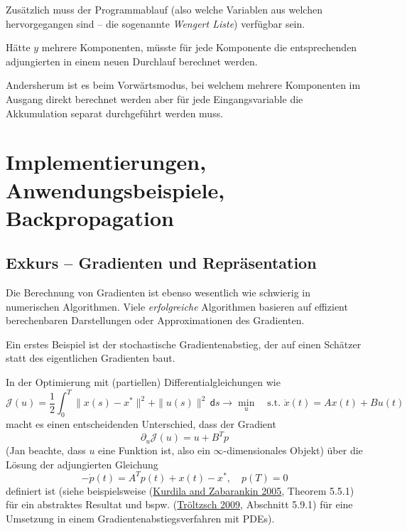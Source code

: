 \documentclass[
]{book}
\theoremstyle{definition}
\theoremstyle{definition}
\theoremstyle{definition}
\theoremstyle{definition}
\theoremstyle{remark}
\begin{document}
Zusätzlich muss der Programmablauf (also welche Variablen aus welchen
hervorgegangen sind -- die sogenannte \emph{Wengert Liste}) verfügbar sein.

Hätte \(y\) mehrere Komponenten, müsste
für jede Komponente die entsprechenden adjungierten in einem neuen
Durchlauf berechnet werden.

Andersherum ist es beim Vorwärtsmodus, bei welchem mehrere Komponenten im
Ausgang direkt berechnet werden aber für jede Eingangsvariable die
Akkumulation separat durchgeführt werden muss.

\hypertarget{implementierungen-anwendungsbeispiele-backpropagation}{%
\chapter{Implementierungen, Anwendungsbeispiele, Backpropagation}\label{implementierungen-anwendungsbeispiele-backpropagation}}

\hypertarget{exkurs-gradienten-und-repruxe4sentation}{%
\section{Exkurs -- Gradienten und Repräsentation}\label{exkurs-gradienten-und-repruxe4sentation}}

Die Berechnung von Gradienten ist ebenso wesentlich wie schwierig in numerischen
Algorithmen.
Viele \emph{erfolgreiche} Algorithmen basieren auf effizient berechenbaren
Darstellungen oder Approximationen des Gradienten.

Ein erstes Beispiel ist der stochastische Gradientenabstieg, der auf einen
Schätzer statt des eigentlichen Gradienten baut.

In der Optimierung mit (partiellen) Differentialgleichungen wie
\begin{equation*}
\mathcal J(u) = \frac 12 \int_0^T\|x(s)-x^*\|^2 + \|u(s)\|^2\,\mathsf{d}s\to \min_{u} \quad \text{s.t. }\dot x(t) =
Ax(t) + Bu(t)
\end{equation*}
macht es einen entscheidenden Unterschied, dass der Gradient
\[\partial_u \mathcal J(u) = u + B^Tp \]
(Jan beachte, dass \(u\) eine Funktion ist, also ein \(\infty\)-dimensionales
Objekt) über die Lösung der adjungierten Gleichung
\begin{equation*}
-\dot p(t) = A^T p(t) + x(t)-x^*, \quad p(T) = 0
\end{equation*}
definiert ist (siehe beispielsweise (\protect\hyperlink{ref-KurZ05}{Kurdila and Zabarankin 2005}, Theorem 5.5.1) für ein
abstraktes Resultat und bspw. (\protect\hyperlink{ref-Tr09}{Tröltzsch 2009}, Abschnitt 5.9.1) für eine
Umsetzung in einem Gradientenabstiegsverfahren mit PDEs).
\end{document}

